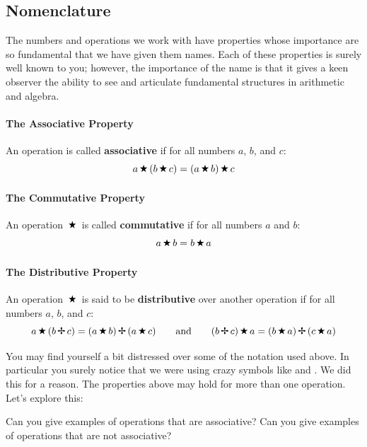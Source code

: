 \subsection{Nomenclature}

The numbers and operations we work with have properties whose
importance are so fundamental that we have given them names. Each of
these properties is surely well known to you; however, the importance
of the name is that it gives a keen observer the ability to see and
articulate fundamental structures in arithmetic and algebra.


\paragraph{The Associative Property} 
An operation  is called \textbf{associative} if for all
numbers $a$, $b$, and $c$:
\[
a \,\text{\ding{72}}\, (b \,\text{\ding{72}}\, c) = (a \,\text{\ding{72}}\, b) \,\text{\ding{72}}\, c
\]


\paragraph{The Commutative Property}
An operation $\,\text{\ding{72}}\,$ is called \textbf{commutative} if for all
numbers $a$ and $b$:
\[
a \,\text{\ding{72}}\, b = b \,\text{\ding{72}}\, a
\]

\paragraph{The Distributive Property}
An operation $\,\text{\ding{72}}\,$ is said to be \textbf{distributive} over another
operation  if for all numbers $a$, $b$, and $c$:
\[
a \,\text{\ding{72}}\,(b \,\text{\ding{66}}\, c)  = (a \,\text{\ding{72}}\, b) \,\text{\ding{66}}\, (a\,\text{\ding{72}}\, c)
\qquad\text{and}\qquad (b \,\text{\ding{66}}\, c)\,\text{\ding{72}}\, a  = (b \,\text{\ding{72}}\, a) \,\text{\ding{66}}\, (c\,\text{\ding{72}}\, a)
\]

You may find yourself a bit distressed over some of the notation used
above. In particular you surely notice that we were using crazy
symbols like  and . We did this for a reason. The
properties above may hold for more than one operation. Let's explore
this:

\begin{question}
Can you give examples of operations that are associative? Can you give
examples of operations that are not associative?
\end{question}
\QM

